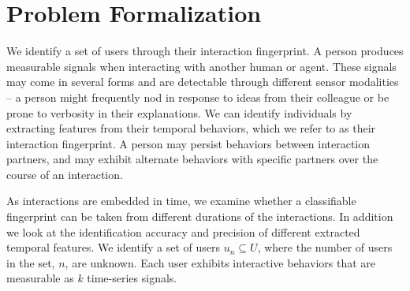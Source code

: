 \documentclass[conference]{IEEEtran}
\begin{document}

\section{Problem Formalization}

We identify a set of users through their interaction fingerprint. A person produces measurable signals when interacting with another human or agent. These signals may come in several forms and are detectable through different sensor modalities -- a person might frequently nod in response to ideas from their colleague or be prone to verbosity in their explanations. We can identify individuals by extracting features from their temporal behaviors, which we refer to as their interaction fingerprint. A person may persist behaviors between interaction partners, and may exhibit alternate behaviors with specific partners over the course of an interaction. 

As interactions are embedded in time, we examine whether a classifiable fingerprint can be taken from different durations of the interactions. In addition we look at the identification accuracy and precision of different extracted temporal features. We identify a set of users $u_n \subseteq U$, where the number of users in the set, $n$, are unknown. Each user exhibits interactive behaviors that are measurable as $k$ time-series signals.
\end{document}
